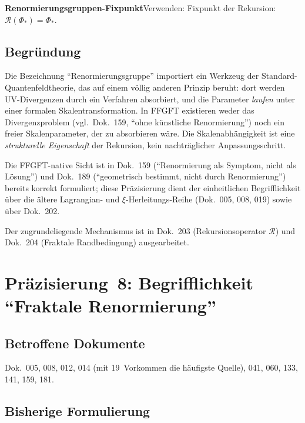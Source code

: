 \smallskip\noindent \textbf{Renormierungsgruppen-Fixpunkt}\quad Verwenden: Fixpunkt der Rekursion: $\mathcal{R}(\Phi_*) = \Phi_*$.

\medskip


\subsection*{Begründung}

Die Bezeichnung \enquote{Renormierungsgruppe} importiert ein Werkzeug
der Standard-Quantenfeldtheorie, das auf einem völlig anderen Prinzip
beruht: dort werden UV-Divergenzen durch ein Verfahren absorbiert, und
die Parameter \emph{laufen} unter einer formalen Skalentransformation.
In FFGFT existieren weder das Divergenzproblem (vgl.\ Dok.~159,
\enquote{ohne künstliche Renormierung}) noch ein freier Skalenparameter, der
zu absorbieren wäre. Die Skalenabhängigkeit ist eine \emph{strukturelle
Eigenschaft} der Rekursion, kein nachträglicher Anpassungsschritt.

Die FFGFT-native Sicht ist in Dok.~159 (\enquote{Renormierung als Symptom,
nicht als Lösung}) und Dok.~189 (\enquote{geometrisch bestimmt, nicht durch
Renormierung}) bereits korrekt formuliert; diese Präzisierung dient der
einheitlichen Begrifflichkeit über die ältere Lagrangian- und
$\xi$-Herleitungs-Reihe (Dok.~005, 008, 019) sowie über Dok.~202.

Der zugrundeliegende Mechanismus ist in Dok.~203
(Rekursionsoperator $\mathcal{R}$) und Dok.~204
(Fraktale Randbedingung) ausgearbeitet.

\section{\texorpdfstring{Präzisierung~8: Begrifflichkeit \enquote{Fraktale Renormierung}}{Praezisierung 8: Begrifflichkeit Fraktale Renormierung}}

\subsection*{Betroffene Dokumente}

Dok.~005, 008, 012, 014 (mit 19~Vorkommen die häufigste Quelle),
041, 060, 133, 141, 159, 181.

\subsection*{Bisherige Formulierung}

